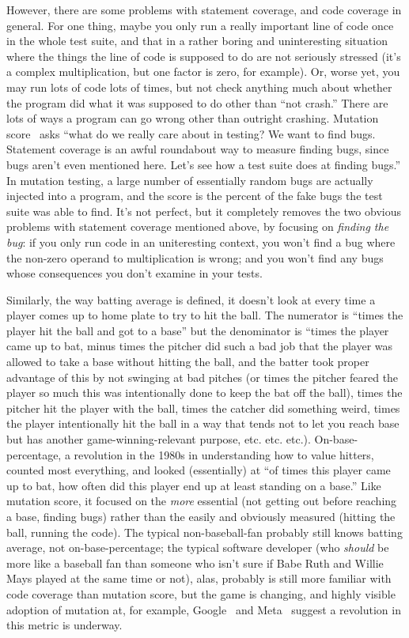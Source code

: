 \documentclass[sigplan,screen]{acmart}
\begin{document}
However, there are some problems with statement coverage, and code
coverage in general.  For one thing, maybe you only run a really
important line of code once in the whole test suite, and that in a
rather boring and uninteresting situation where the things the line of
code is supposed to do are not  seriously stressed (it’s a complex
multiplication, but one factor is zero, for example).  Or, worse yet,
you may run lots of code lots of times, but not check anything much
about whether the program did what it was supposed to do other than
“not crash.”  There are lots of ways a program can go wrong other than
outright crashing.  Mutation score~\cite{demillo1978hints,Discontents} asks “what do we really care about
in testing?  We want to find bugs.  Statement coverage is an awful
roundabout way to measure finding bugs, since bugs aren’t even
mentioned here.  Let’s see how a test suite does at finding bugs.”  In
mutation testing, a large number of essentially random bugs are
actually injected into a program, and the score is the percent of the
fake bugs the test suite was able to find.  It’s not perfect, but
it completely removes the two obvious problems
with statement coverage mentioned above, by focusing on \emph{finding
  the bug}: if you only run code in an uniteresting context, you won't
find a bug where the non-zero operand to multiplication is wrong; and
you won't find any bugs whose consequences you don't examine in your tests.

Similarly, the way batting average is defined, it doesn’t look at
every time a player comes up to home plate to try to hit the ball.
The numerator is “times the player hit the ball and got to a base” but
the denominator is “times the player came up to bat, minus times the
pitcher did such a bad job that the player was allowed to take a base
without hitting the ball, and the batter took proper advantage of this
by not swinging at bad pitches (or times the pitcher feared the player
so much this was intentionally done to keep the bat off the ball),
times the pitcher hit the player with the ball, times the catcher did
something weird, times the player intentionally hit the ball in a way
that tends not to let you reach base but has another
game-winning-relevant purpose, etc. etc. etc.).  On-base-percentage, a
revolution in the 1980s in understanding how to value hitters, counted
most everything, and looked (essentially) at “of times this player
came up to bat, how often did this player end up at least standing on
a base.”  Like mutation score, it focused on the \emph{more} essential (not
getting out before reaching a base, finding bugs) rather than the
easily and obviously measured (hitting the ball, running the code).
The typical non-baseball-fan probably still knows batting average, not
on-base-percentage; the typical software developer (who \emph{should}
be more like a baseball fan than someone who isn't sure if Babe Ruth
and Willie Mays played at the same time or not), alas, probably is
still more familiar with code coverage than mutation score, but the
game is changing, and highly visible adoption of mutation at, for example, Google~\cite{PetrovicMutationGoogle}
and Meta~\cite{BellerFacebookMutation} suggest a revolution in this
metric is underway.
\end{document}
